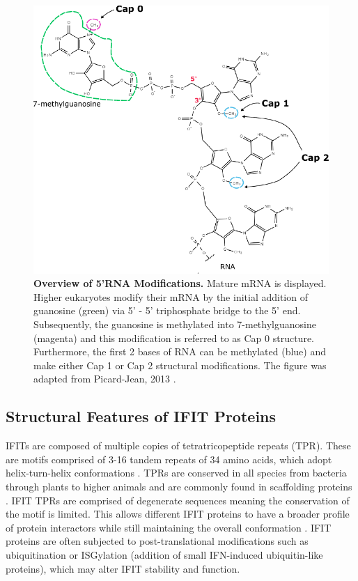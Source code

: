 \begin{figure}
    \centering
    \includegraphics[width=0.75\linewidth]{04. Introduction//Figs/02. 5-RNA Modifications.pdf}
    \caption[Overview of 5'RNA Modifications.]{\textbf{Overview of 5'RNA Modifications.} Mature mRNA is displayed. Higher eukaryotes modify their mRNA by the initial addition of guanosine (green) via 5' - 5' triphosphate bridge to the 5' end. Subsequently, the guanosine is methylated into 7-methylguanosine (magenta) and this modification is referred to as Cap 0 structure. Furthermore, the first 2 bases of RNA can be methylated (blue) and make either Cap 1 or Cap 2 structural modifications. The figure was adapted from Picard-Jean, 2013 \cite{Picard-Jean2013RNAGenomes}.}
    \label{fig:Overview of 5'RNA Modifications.}
\end{figure}

\subsection{Structural Features of IFIT Proteins} \label{subsec:Structural Features of IFIT Proteins}
IFITs are composed of multiple copies of tetratricopeptide repeats (TPR). These are motifs comprised of 3-16 tandem repeats of 34 amino acids, which adopt helix-turn-helix conformations \cite{DAndrea2003TPRHelix}. TPRs are conserved in all species from bacteria through plants to higher animals and are commonly found in scaffolding proteins \cite{Vladimer2014IFITs:Proteins}. IFIT TPRs are comprised of degenerate sequences meaning the conservation of the motif is limited. This allows different IFIT proteins to have a broader profile of protein interactors while still maintaining the overall conformation \cite{Fensterl2015Interferon-InducedPathogenesis}. IFIT proteins are often subjected to post-translational modifications such as ubiquitination or ISGylation (addition of small IFN-induced ubiquitin-like proteins), which may alter IFIT stability and function.

